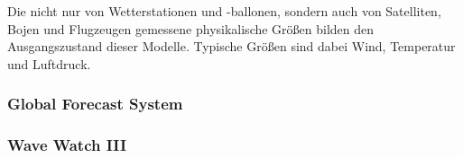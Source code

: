 Die nicht nur von Wetterstationen und -ballonen, sondern auch von
Satelliten, Bojen und Flugzeugen gemessene physikalische Größen bilden
den Ausgangszustand dieser Modelle. Typische Größen sind dabei Wind,
Temperatur und Luftdruck. 



\subsubsection{Global Forecast System}
\subsubsection{Wave Watch III}



















